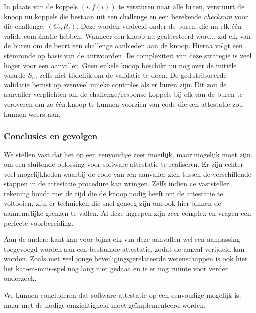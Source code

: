 In plaats van de koppels $(i, f(i))$ te versturen naar alle buren, verstuurt de
knoop nu koppels die bestaan uit een challenge en een berekende \emph{checksum}
voor die challenge: $(C_i,R_i)$. Deze worden verdeeld onder de buren, die nu
elk \'e\'en valide combinatie hebben. Wanneer een knoop nu geattesteerd wordt,
zal elk van de buren om de beurt een challenge aanbieden aan de knoop. Hierna
volgt een stemronde op basis van de antwoorden. De complexiteit van deze
strategie is veel hoger voor een aanvaller. Geen enkele knoop beschikt nu nog
over de initi\"ele waarde $S_u$, zelfs niet tijdelijk om de validatie te doen.
De gedistribueerde validatie berust op evenveel unieke controles als er buren
zijn. Dit zou de aanvaller verplichten om de challenge/response koppels bij elk
van de buren te veroveren om zo \'e\'en knoop te kunnen voorzien van code die
een attestatie zou kunnen weerstaan.

\subsubsection*{Conclusies en gevolgen}

We stellen vast dat het op een eenvoudige \mcu zeer moeilijk, maar mogelijk
moet zijn, om een sluitende oplossing voor software-attestatie te realiseren.
Er zijn echter veel mogelijkheden waarbij de code van een aanvaller zich tussen
de verschillende stappen in de attestatie procedure kan wringen. Zelfs indien
de vaststeller rekening houdt met de tijd die de knoop nodig heeft om de
attestatie te voltooien, zijn er technieken die snel genoeg zijn om ook hier
binnen de aannemelijke grenzen te vallen. Al deze ingrepen zijn zeer complex en
vragen een perfecte voorbereiding.

Aan de andere kant kan voor bijna elk van deze aanvallen wel een aanpassing
toegevoegd worden aan een bestaande attestatie, zodat de aanval verijdeld kan
worden. Zoals met veel jonge beveiligingsgerelateerde wetenschappen is ook hier
het kat-en-muis-spel nog lang niet gedaan en is er nog ruimte voor verder
onderzoek.

We kunnen concluderen dat software-attestatie op een eenvoudige \mcu mogelijk
is, maar met de nodige omzichtigheid moet ge\"implementeerd worden.

